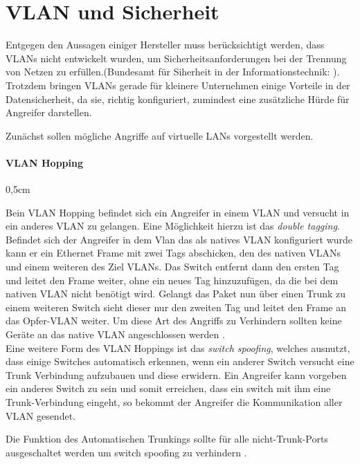 \section{VLAN und Sicherheit}

\glqq Entgegen den Aussagen einiger Hersteller muss berücksichtigt werden, dass VLANs nicht entwickelt wurden, um Sicherheitsanforderungen bei der Trennung von Netzen zu erfüllen.\grqq (Bundesamt für Siherheit in der Informationstechnik: \cite{bsiswitch}).\\

Trotzdem bringen VLANs gerade für kleinere Unternehmen einige Vorteile in der Datensicherheit, da sie, richtig konfiguriert, zumindest eine zusätzliche Hürde für Angreifer darstellen. 

Zunächst sollen mögliche Angriffe auf virtuelle LANs vorgestellt werden.

 \paragraph{VLAN Hopping}
  \begin{addmargin}[1cm]{0,5cm} 

  {Bein VLAN Hopping befindet sich ein Angreifer in einem VLAN und versucht in ein anderes VLAN zu gelangen\cite{alabady2008design}. 
  Eine Möglichkeit hierzu ist das \emph{double tagging}. Befindet sich der Angreifer in dem Vlan das als natives VLAN konfiguriert wurde kann er ein Ethernet Frame mit zwei Tags abschicken, den des nativen VLANs und einem weiteren des Ziel VLANs. Das Switch entfernt dann den ersten Tag und leitet den Frame weiter, ohne ein neues Tag hinzuzufügen, da die bei dem nativen VLAN nicht benötigt wird. Gelangt das Paket nun über einen Trunk zu einem weiteren Switch sieht dieser nur den zweiten Tag und leitet den Frame an das Opfer-VLAN weiter.
  Um diese Art des Angriffs zu Verhindern sollten keine Geräte an das native VLAN angeschlossen werden \cite{cisco14rout}.\\
  
 
  
 Eine weitere Form des VLAN Hoppings ist das \emph{switch spoofing}, welches ausnutzt, dass einige Switches automatisch erkennen, wenn ein anderer Switch versucht eine Trunk Verbindung aufzubauen und diese erwidern. Ein Angreifer kann vorgeben ein anderes Switch zu sein und somit erreichen, dass ein switch mit ihm eine Trunk-Verbindung eingeht, so bekommt der Angreifer die Kommunikation aller VLAN gesendet. 
 
 Die Funktion des Automatischen Trunkings sollte für alle nicht-Trunk-Ports ausgeschaltet werden um switch spoofing zu verhindern \cite{cisco14rout}. }
 
  \end{addmargin}
   
